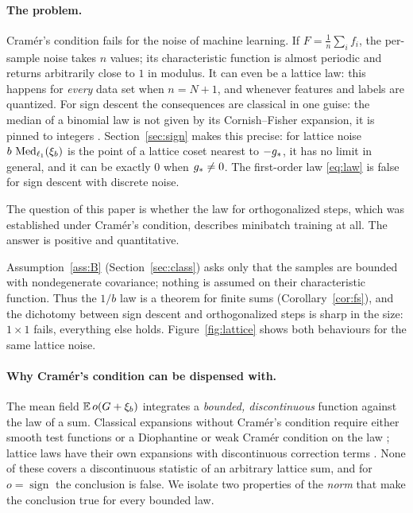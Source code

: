 \documentclass[anon,12pt]{colt2026}
\begin{document}
\paragraph{The problem.} Cram\'er's condition fails for the noise of machine learning. If $F=\frac1n\sum_if_i$, the
per-sample noise takes $n$ values; its characteristic function is almost periodic and returns arbitrarily close to
$1$ in modulus. It can even be a lattice law: this happens for \emph{every} data set when $n=N+1$, and whenever
features and labels are quantized. For sign descent the consequences are classical in one guise: the median of a
binomial law is not given by its Cornish--Fisher expansion, it is pinned to integers
\citep{kaas,hamza}. Section~\ref{sec:sign} makes this precise: for lattice noise $b\,\operatorname{Med}_{\ell_1}(\xi_b)$ is the point of a
lattice coset nearest to $-g_\ast$, it has no limit in general, and it can be exactly $0$ when $g_\ast\ne0$. The
first-order law \eqref{eq:law} is false for sign descent with discrete noise.

The question of this paper is whether the law for orthogonalized steps, which was established under Cram\'er's
condition, describes minibatch training at all. The answer is positive and quantitative.

\begin{theorem}\label{thm:nuclear}\StmtNuclear\end{theorem}

Assumption~\ref{ass:B} (Section~\ref{sec:class}) asks only that the samples are bounded with nondegenerate
covariance; nothing is assumed on their characteristic function. Thus the $1/b$ law is a theorem for finite sums
(Corollary~\ref{cor:fs}), and the dichotomy between sign descent and orthogonalized steps is sharp in the size:
$1\times1$ fails, everything else holds. Figure~\ref{fig:lattice} shows both behaviours for the same lattice noise.

\paragraph{Why Cram\'er's condition can be dispensed with.} The mean field $\mathbb{E}\,o(G+\xi_b)$ integrates a
\emph{bounded, discontinuous} function against the law of a sum. Classical expansions without Cram\'er's condition
require either smooth test functions \citep{gh,br} or a Diophantine or weak Cram\'er condition on the law
\citep{breuillard,angstpoly,song}; lattice laws have their own expansions with discontinuous correction terms
\citep{esseen,br,bggh,df}. None of these covers a discontinuous statistic of an arbitrary lattice sum, and for $o=\operatorname{sign}$
the conclusion is false. We isolate two properties of the \emph{norm} that make the conclusion true for every bounded
law.
\end{document}
